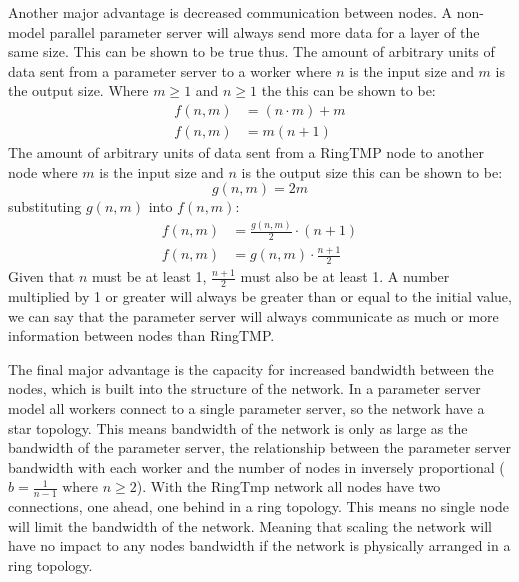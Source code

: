 Another major advantage is decreased communication between nodes. A non-model
parallel parameter server will always send more data for a
layer of the same size. This can be shown to be true thus.
\clearpage
The amount of arbitrary units of data sent from a parameter server to a worker
where \(n\) is the input size and \(m\) is the output size. Where \( m \geq 1\)
and \( n \geq 1\) the this can be shown to be:
\begin{equation}
    \begin{aligned}
        f(n,m) &= (n \cdot m) + m\\
        f(n,m) &= m(n+1)
    \end{aligned}
\end{equation}
The amount of arbitrary units of data sent from a RingTMP node to another node where \(m\) is
the input size and \(n\) is the output size this can be shown to be:
\begin{equation}
    g(n,m) = 2m
\end{equation}
substituting \(g(n,m)\) into \(f(n,m)\):
\begin{equation}
    \begin{aligned}
        f(n,m) &= \frac{g(n,m)}{2} \cdot (n+1)\\[1em]
        f(n,m) &= g(n,m) \cdot \frac{n+1}{2}
    \end{aligned}
\end{equation}
Given that \(n\) must be at least 1,  \( \frac{n+1}{2} \) must also be at least
1. A number multiplied by 1 or greater will always be greater than or equal to
the initial value, we can say that the parameter server will always communicate
as much or more information between nodes than RingTMP.

The final major advantage is the capacity for increased bandwidth between the
nodes, which is built into the structure of the network. In a parameter server
model all workers connect to a single parameter server, so the network have a
star topology. This means bandwidth of the network is only as large as the
bandwidth of the parameter server, the relationship between the parameter server
bandwidth with each worker and the number of nodes in inversely proportional
(\(b = \frac{1}{n-1} \text{ where } n \geq 2\)). With the RingTmp network all
nodes have two connections, one ahead, one behind in a ring topology. This means
no single node will limit the bandwidth of the network. Meaning that scaling the
network will have no impact to any nodes bandwidth if the network is physically
arranged in a ring topology.

